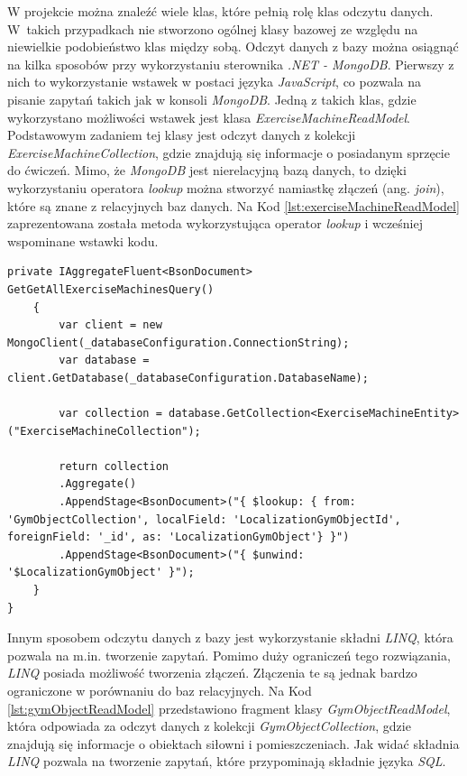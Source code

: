 \documentclass[a4paper,twoside,12pt]{book}
\newcommand{\obcy}[1]{\emph{#1}}
\newcommand{\ang}[1]{{\selectlanguage{british}\obcy{#1}}}
\begin{document}
W projekcie można znaleźć wiele klas, które pełnią rolę klas odczytu danych. W~takich przypadkach nie stworzono ogólnej klasy bazowej ze względu na niewielkie podobieństwo klas między sobą. Odczyt danych z bazy można osiągnąć na kilka sposobów przy wykorzystaniu sterownika \textit{.NET - MongoDB}. Pierwszy z nich to wykorzystanie wstawek w postaci języka \textit{JavaScript}, co pozwala na pisanie zapytań takich jak w konsoli \textit{MongoDB}. Jedną z takich klas, gdzie wykorzystano możliwości wstawek jest klasa \textit{ExerciseMachineReadModel}. Podstawowym zadaniem tej klasy jest odczyt danych z kolekcji \textit{ExerciseMachineCollection}, gdzie znajdują się informacje o posiadanym sprzęcie do ćwiczeń. Mimo, że \textit{MongoDB} jest nierelacyjną bazą danych, to dzięki wykorzystaniu operatora \textit{lookup} można stworzyć namiastkę złączeń (ang. \ang{join}), które są znane z relacyjnych baz danych. Na Kod \ref{lst:exerciseMachineReadModel} zaprezentowana została metoda wykorzystująca operator \textit{lookup} i wcześniej wspominane wstawki kodu.
\begin{lstlisting}[caption={Metoda odczytu danych z kolekcji \textit{ExerciseMachineCollection} przy wykorzystaniu wstawek \textit{JavaScript}}, label={lst:exerciseMachineReadModel}]
	private IAggregateFluent<BsonDocument> GetGetAllExerciseMachinesQuery()
	{
		var client = new MongoClient(_databaseConfiguration.ConnectionString);
		var database = client.GetDatabase(_databaseConfiguration.DatabaseName);
		
		var collection = database.GetCollection<ExerciseMachineEntity>("ExerciseMachineCollection");
		
		return collection
		.Aggregate()
		.AppendStage<BsonDocument>("{ $lookup: { from: 'GymObjectCollection', localField: 'LocalizationGymObjectId', foreignField: '_id', as: 'LocalizationGymObject'} }")
		.AppendStage<BsonDocument>("{ $unwind: '$LocalizationGymObject' }");
	}
}
\end{lstlisting}
Innym sposobem odczytu danych z bazy jest wykorzystanie składni \textit{LINQ}, która pozwala na m.in. tworzenie zapytań. Pomimo duży ograniczeń tego rozwiązania, \textit{LINQ} posiada możliwość tworzenia złączeń. Złączenia te są jednak bardzo ograniczone w porównaniu do baz relacyjnych. Na Kod \ref{lst:gymObjectReadModel} przedstawiono fragment klasy \textit{GymObjectReadModel}, która odpowiada za odczyt danych z kolekcji \textit{GymObjectCollection}, gdzie znajdują się informacje o obiektach siłowni i pomieszczeniach. Jak widać składnia \textit{LINQ} pozwala na tworzenie zapytań, które przypominają składnie języka \textit{SQL}.
\end{document}
